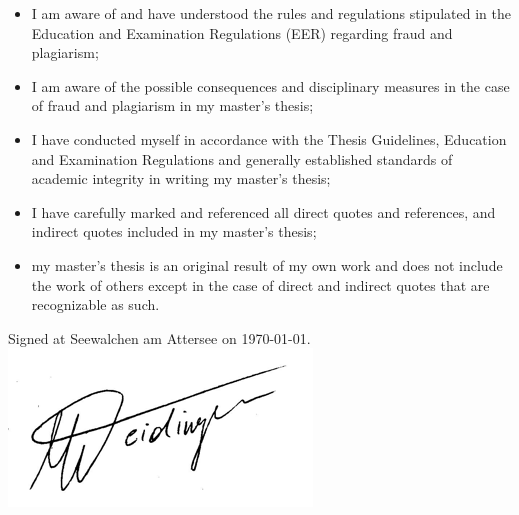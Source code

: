 \documentclass[a4paper,12pt]{article}
\theoremstyle{plain}
\theoremstyle{definition}
\theoremstyle{definition}
\theoremstyle{definition}
\theoremstyle{definition}
\begin{document}
\begin{itemize}
    \item I am aware of and have understood the rules and regulations stipulated in the Education and Examination Regulations (EER) regarding fraud and plagiarism;
    \item I am aware of the possible consequences and disciplinary measures in the case of fraud and plagiarism in my master's thesis;
    \item I have conducted myself in accordance with the Thesis Guidelines, Education and Examination Regulations and generally established standards of academic integrity in writing my master's thesis;
    \item I have carefully marked and referenced all direct quotes and references, and indirect quotes included in my master's thesis;
    \item my master's thesis is an original result of my own work and does not include the work of others except in the case of direct and indirect quotes that are recognizable as such.
\end{itemize}
\vspace{1cm}
\centering
Signed at Seewalchen am Attersee on \today.\\

\vspace{1cm}
\includegraphics{signature.png}

 \justifying
\clearpage
\end{document}
